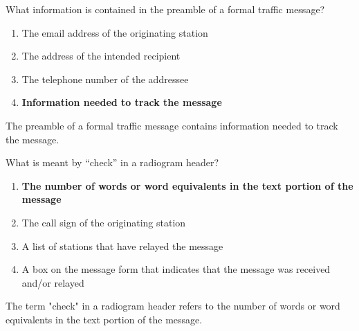 \begin{tcolorbox}[colback=gray!10!white,colframe=black!75!black,title={T2C10}]
    What information is contained in the preamble of a formal traffic message?
    \begin{enumerate}[label=\Alph*),noitemsep]
        \item The email address of the originating station
        \item The address of the intended recipient
        \item The telephone number of the addressee
        \item \textbf{Information needed to track the message}
    \end{enumerate}
\end{tcolorbox}
The preamble of a formal traffic message contains information needed to track the message.

\begin{tcolorbox}[colback=gray!10!white,colframe=black!75!black,title={T2C11}]
    What is meant by “check” in a radiogram header?
    \begin{enumerate}[label=\Alph*),noitemsep]
        \item \textbf{The number of words or word equivalents in the text portion of the message}
        \item The call sign of the originating station
        \item A list of stations that have relayed the message
        \item A box on the message form that indicates that the message was received and/or relayed
    \end{enumerate}
\end{tcolorbox}
The term "check" in a radiogram header refers to the number of words or word equivalents in the text portion of the message.

